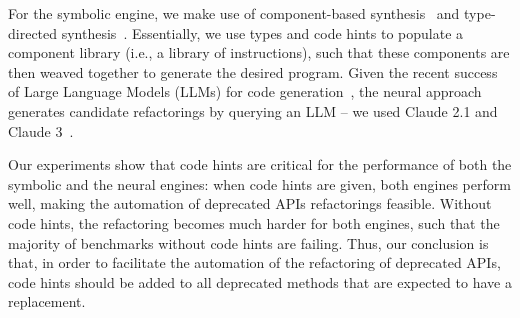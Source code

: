 \documentclass[sigconf,review,anonymous]{acmart}
\begin{document}
For the symbolic engine, we make use of component-based synthesis~\cite{DBLP:conf/icse/JhaGST10,DBLP:conf/pldi/GulwaniJTV11,DBLP:conf/popl/FengM0DR17}
and type-directed synthesis~\cite{DBLP:conf/sfp/Katayama05,DBLP:conf/pldi/OseraZ15,DBLP:journals/pacmpl/YamaguchiMDW21}. Essentially, we use types and code hints to populate
a component library (i.e., a library of instructions), such that these components are then weaved together to generate the desired program.
Given the recent success of Large Language Models (LLMs) for code generation~\cite{chen2022codet,DBLP:journals/corr/abs-2108-07732,DBLP:journals/corr/abs-2302-05527,DBLP:journals/corr/abs-2202-13169,llmsforcodecompletion,codegenclasslevel,ni2023lever,zhang2023repocoder,lostintranslation,Ding2024cocomic,yang2024sweagent}, the neural approach 
generates candidate refactorings by querying an LLM -- we used Claude 2.1 and Claude 3~\cite{claude}.


Our experiments show that code hints are critical for the performance of both the symbolic and the neural engines: when code hints are given, both engines perform well, making the automation of deprecated APIs refactorings feasible. Without code hints, the refactoring becomes much harder for both engines, such that the majority of benchmarks without code hints are failing. Thus, our conclusion is that, in order to facilitate
the automation of the refactoring of deprecated APIs, code hints should be added to all deprecated methods that are expected to have a replacement.
\end{document}
